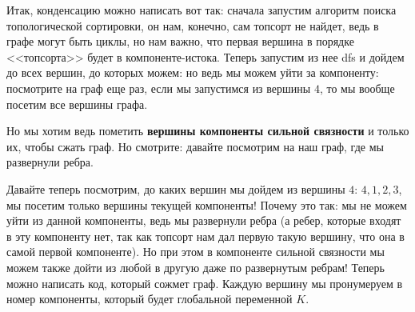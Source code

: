 \documentclass{article}
\begin{document}
Итак, конденсацию можно написать вот так: сначала запустим алгоритм поиска топологической сортировки, он нам, конечно, сам топсорт не найдет, ведь в графе могут быть циклы, но нам важно, что первая вершина в порядке <<топсорта>> будет в компоненте-истока. Теперь запустим из нее dfs и дойдем до всех вершин, до которых можем: но ведь мы можем уйти за компоненту: посмотрите на граф еще раз, если мы запустимся из вершины $4$, то мы вообще посетим все вершины графа. 
\begin{center}
    \end{center}
Но мы хотим ведь пометить \textbf{вершины компоненты сильной связности} и только их, чтобы сжать граф. Но смотрите: давайте посмотрим на наш граф, где мы развернули ребра.

\begin{center}
    \end{center}
Давайте теперь посмотрим, до каких вершин мы дойдем из вершины $4$: $4,1,2,3$, мы посетим только вершины текущей компоненты! Почему это так: мы не можем уйти из данной компоненты, ведь мы развернули ребра (а ребер, которые входят в эту компоненту нет, так как топсорт нам дал первую такую вершину, что она в самой первой компоненте). Но при этом в компоненте сильной связности мы можем также дойти из любой в другую даже по развернутым ребрам!
Теперь можно написать код, который сожмет граф. Каждую вершину мы пронумеруем в номер компоненты, который будет глобальной переменной $K$.
\end{document}
